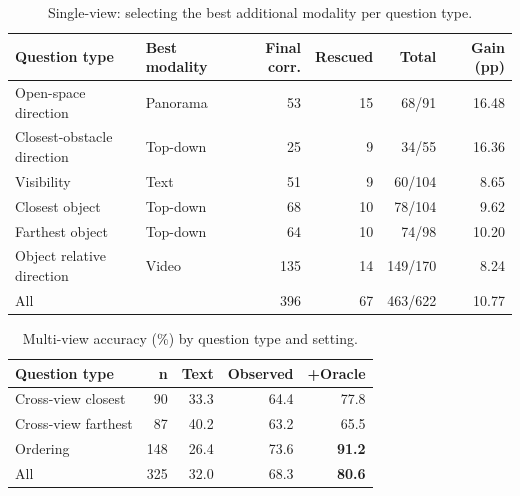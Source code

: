 \begin{table}[t]
\centering
\caption{Single-view: selecting the best additional modality per question type.}
\label{tab:sv_best}
\begin{tabular}{llrrrr}
\toprule
Question type & Best modality & Final corr. & Rescued & Total & Gain (pp) \\
\midrule
Open-space direction       & Panorama           &  53 & 15 &  68/91  & 16.48 \\
Closest-obstacle direction & Top-down           &  25 &  9 &  34/55  & 16.36 \\
Visibility                 & Text               &  51 &  9 &  60/104 &  8.65 \\
Closest object             & Top-down           &  68 & 10 &  78/104 &  9.62 \\
Farthest object            & Top-down           &  64 & 10 &  74/98  & 10.20 \\
Object relative direction  & Video              & 135 & 14 & 149/170 &  8.24 \\
\midrule
All                        &                    & 396 & 67 & 463/622 & 10.77 \\
\bottomrule
\end{tabular}
\end{table}

\begin{table}[t]
\centering
\caption{Multi-view accuracy (\%) by question type and setting.}
\label{tab:mvc}
\begin{tabular}{lrrrr}
\toprule
Question type & n & Text & Observed & +Oracle \\
\midrule
Cross-view closest  &  90 & 33.3 & 64.4 & 77.8 \\
Cross-view farthest &  87 & 40.2 & 63.2 & 65.5 \\
Ordering            & 148 & 26.4 & 73.6 & \textbf{91.2} \\
\midrule
All                 & 325 & 32.0 & 68.3 & \textbf{80.6} \\
\bottomrule
\end{tabular}
\end{table}
